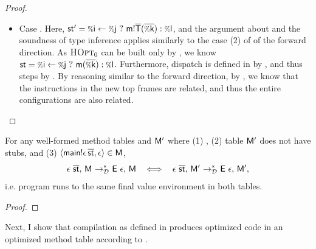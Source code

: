{\begin{proof}
{\begin{itemize}
    \item Case . Here,
      $\st' = \cond\i\j{\call{\msig{\m}{\ol\Ty}}{\ol{\v k}}}{\v\l}$,
      and the argument about  and the soundness of type inference
      applies similarly to the case (2) of  of the forward direction.
      As $\textsc{HOpt}_0$ can be built only by , we know
      $\st = \cond\i\j{\call\m{\ol{\v\k}}}{\v\l}$. Furthermore, dispatch is
      defined in \mtbl by , and thus 
      steps by . By reasoning similar to the forward direction,
      by , we know that the instructions in the new top frames are
      related, and thus the entire configurations are also related.
  \end{itemize}
}
\end{proof}

\begin{theorem}\label{thm:disp-equiv}
  For any well-formed method tables \mtbl and $\mathsf{M}'$ where (1) \eqmtbld,
  (2) table $\mathsf{M}'$ does not have stubs,
  and (3) $\langle \mathsf{main}!{\epsilon}\,{\overline{\mathsf{st}}}, \epsilon \rangle \in \mathsf{M}$,
  \[
    \config{\done\ \ol\st}{\mtbl} \stepdmul \config{\env\ \done}{\mtbl}
    \ \ \iff\ \
    \config{\done\ \ol\st}{\mtbl'} \stepdmul \config{\env\ \done}{\mtbl'},
  \]
  i.e. program \ol\st runs to the same final value environment in both tables.
\end{theorem}
\begin{proof}
\end{proof}

Next, I show that compilation as defined in 
produces optimized code in an optimized method table
according to .

}
